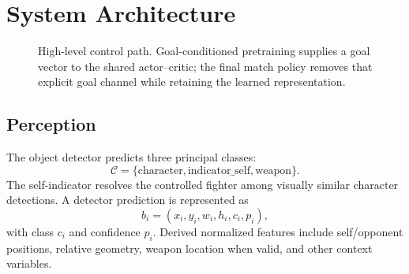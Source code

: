 \documentclass[11pt]{article}
\begin{document}
\section{System Architecture}
\begin{figure}[t]
\centering
{}
\caption{High-level control path. Goal-conditioned pretraining supplies a goal vector to the shared actor--critic; the final match policy removes that explicit goal channel while retaining the learned representation.}
\label{fig:system}
\end{figure}

\subsection{Perception}
The object detector predicts three principal classes:
\begin{equation}
\mathcal C=\{\text{character},\text{indicator\_self},\text{weapon}\}.
\end{equation}
The self-indicator resolves the controlled fighter among visually similar character detections. A detector prediction is represented as
\begin{equation}
b_i=(x_i,y_i,w_i,h_i,c_i,p_i),
\end{equation}
with class $c_i$ and confidence $p_i$. Derived normalized features include self/opponent positions, relative geometry, weapon location when valid, and other context variables.
\end{document}
